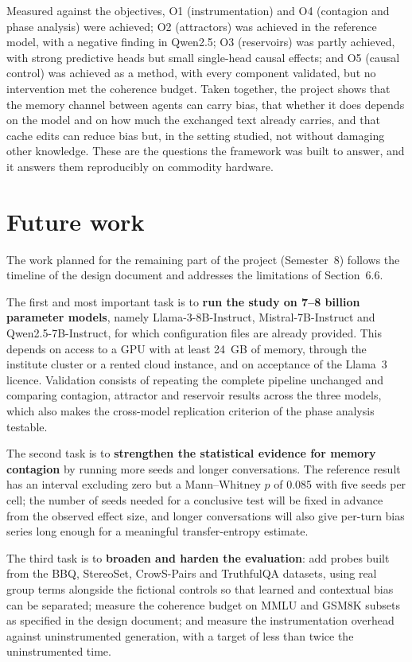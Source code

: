 Measured against the objectives, O1 (instrumentation) and O4 (contagion and phase analysis) were achieved; O2 (attractors) was achieved in the reference model, with a negative finding in Qwen2.5; O3 (reservoirs) was partly achieved, with strong predictive heads but small single-head causal effects; and O5 (causal control) was achieved as a method, with every component validated, but no intervention met the coherence budget. Taken together, the project shows that the memory channel between agents can carry bias, that whether it does depends on the model and on how much the exchanged text already carries, and that cache edits can reduce bias but, in the setting studied, not without damaging other knowledge. These are the questions the framework was built to answer, and it answers them reproducibly on commodity hardware.

\section{Future work}
The work planned for the remaining part of the project (Semester~8) follows the timeline of the design document and addresses the limitations of Section~6.6.

The first and most important task is to \textbf{run the study on 7--8 billion parameter models}, namely Llama-3-8B-Instruct, Mistral-7B-Instruct and Qwen2.5-7B-Instruct, for which configuration files are already provided. This depends on access to a GPU with at least 24~GB of memory, through the institute cluster or a rented cloud instance, and on acceptance of the Llama~3 licence. Validation consists of repeating the complete pipeline unchanged and comparing contagion, attractor and reservoir results across the three models, which also makes the cross-model replication criterion of the phase analysis testable.

The second task is to \textbf{strengthen the statistical evidence for memory contagion} by running more seeds and longer conversations. The reference result has an interval excluding zero but a Mann--Whitney $p$ of 0.085 with five seeds per cell; the number of seeds needed for a conclusive test will be fixed in advance from the observed effect size, and longer conversations will also give per-turn bias series long enough for a meaningful transfer-entropy estimate.

The third task is to \textbf{broaden and harden the evaluation}: add probes built from the BBQ, StereoSet, CrowS-Pairs and TruthfulQA datasets, using real group terms alongside the fictional controls so that learned and contextual bias can be separated; measure the coherence budget on MMLU and GSM8K subsets as specified in the design document; and measure the instrumentation overhead against uninstrumented generation, with a target of less than twice the uninstrumented time.

